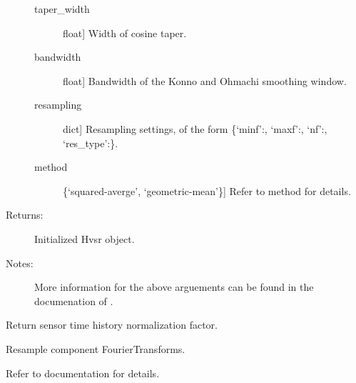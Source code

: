 \documentclass[letterpaper,10pt,english,openany,oneside]{sphinxmanual}
\begin{document}
\begin{fulllineitems}
\begin{fulllineitems}
\begin{description}
\begin{description}
\item[{taper\_width}] \leavevmode{[}float{]}
Width of cosine taper.

\item[{bandwidth}] \leavevmode{[}float{]}
Bandwidth of the Konno and Ohmachi smoothing window.

\item[{resampling}] \leavevmode{[}dict{]}
Resampling settings, of the form 
\{‘minf’:, ‘maxf’:, ‘nf’:, 
‘res\_type’:\}.

\item[{method}] \leavevmode{[}\{‘squared-averge’, ‘geometric-mean’\}{]}
Refer to method  for details.

\end{description}

\item[{Returns:}] \leavevmode
Initialized Hvsr object.

\item[{Notes:}] \leavevmode
More information for the above arguements can be found in
the documenation of .

\end{description}

\end{fulllineitems}


\begin{fulllineitems}
\label{\detokenize{index:hvsrpy.Sensor3c.normalization_factor}}
Return sensor time history normalization factor.

\end{fulllineitems}


\begin{fulllineitems}
\label{\detokenize{index:hvsrpy.Sensor3c.resample}}
Resample component FourierTransforms.

Refer to  documentation for details.


\end{fulllineitems}
\end{fulllineitems}
\end{document}
